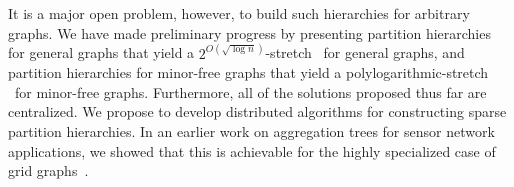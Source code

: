 It is a major open problem, however, to build such hierarchies for
arbitrary graphs.  We have made preliminary progress by presenting
partition hierarchies for general graphs that yield a $2^{O(\sqrt{\log
    n})}$-stretch \ust\ for general graphs, and partition hierarchies
for minor-free graphs that yield a polylogarithmic-stretch \ust\ for
minor-free graphs.  Furthermore, all of the solutions proposed thus
far are centralized.  We propose to develop distributed algorithms for
constructing sparse partition hierarchies.  In an earlier work on
aggregation trees for sensor network applications, we showed that this
is achievable for the highly specialized case of grid
graphs~\cite{jia+nrs:gist}.

